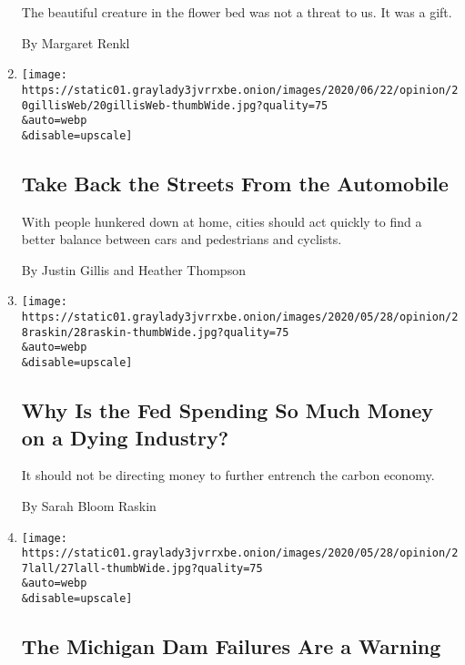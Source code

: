 \begin{enumerate}
  The beautiful creature in the flower bed was not a threat to us. It
  was a gift.

  By Margaret Renkl
\item
  \href{/2020/06/20/opinion/pandemic-automobile-cities.html}{}

  \texttt{[image: https://static01.graylady3jvrrxbe.onion/images/2020/06/22/opinion/20gillisWeb/20gillisWeb-thumbWide.jpg?quality=75\\\&auto=webp\\\&disable=upscale]}

  \hypertarget{take-back-the-streets-from-the-automobile}{%
  \subsection{Take Back the Streets From the
  Automobile}\label{take-back-the-streets-from-the-automobile}}

  With people hunkered down at home, cities should act quickly to find a
  better balance between cars and pedestrians and cyclists.

  By Justin Gillis and Heather Thompson
\item
  \href{/2020/05/28/opinion/fed-fossil-fuels.html}{}

  \texttt{[image: https://static01.graylady3jvrrxbe.onion/images/2020/05/28/opinion/28raskin/28raskin-thumbWide.jpg?quality=75\\\&auto=webp\\\&disable=upscale]}

  \hypertarget{why-is-the-fed-spending-so-much-money-on-a-dying-industry}{%
  \subsection{Why Is the Fed Spending So Much Money on a Dying
  Industry?}\label{why-is-the-fed-spending-so-much-money-on-a-dying-industry}}

  It should not be directing money to further entrench the carbon
  economy.

  By Sarah Bloom Raskin
\item
  \href{/2020/05/27/opinion/michigan-edenville-dam.html}{}

  \texttt{[image: https://static01.graylady3jvrrxbe.onion/images/2020/05/28/opinion/27lall/27lall-thumbWide.jpg?quality=75\\\&auto=webp\\\&disable=upscale]}

  \hypertarget{the-michigan-dam-failures-are-a-warning}{%
  \subsection{The Michigan Dam Failures Are a
  Warning}\label{the-michigan-dam-failures-are-a-warning}}


\end{enumerate}
